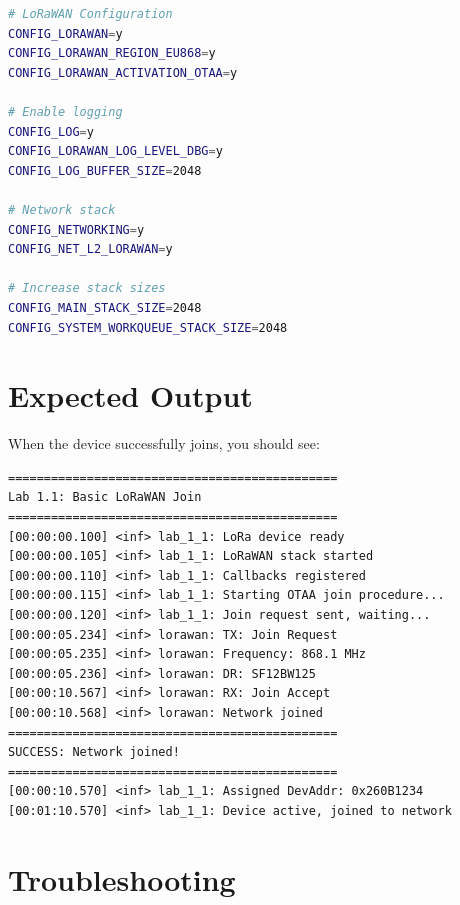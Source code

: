 \documentclass[11pt,a4paper]{article}
\begin{document}
\begin{solutionbox}
\begin{lstlisting}[language=bash]
# LoRaWAN Configuration
CONFIG_LORAWAN=y
CONFIG_LORAWAN_REGION_EU868=y
CONFIG_LORAWAN_ACTIVATION_OTAA=y

# Enable logging
CONFIG_LOG=y
CONFIG_LORAWAN_LOG_LEVEL_DBG=y
CONFIG_LOG_BUFFER_SIZE=2048

# Network stack
CONFIG_NETWORKING=y
CONFIG_NET_L2_LORAWAN=y

# Increase stack sizes
CONFIG_MAIN_STACK_SIZE=2048
CONFIG_SYSTEM_WORKQUEUE_STACK_SIZE=2048
\end{lstlisting}

\end{solutionbox}

\section{Expected Output}

When the device successfully joins, you should see:

\begin{lstlisting}
==============================================
Lab 1.1: Basic LoRaWAN Join
==============================================
[00:00:00.100] <inf> lab_1_1: LoRa device ready
[00:00:00.105] <inf> lab_1_1: LoRaWAN stack started
[00:00:00.110] <inf> lab_1_1: Callbacks registered
[00:00:00.115] <inf> lab_1_1: Starting OTAA join procedure...
[00:00:00.120] <inf> lab_1_1: Join request sent, waiting...
[00:00:05.234] <inf> lorawan: TX: Join Request
[00:00:05.235] <inf> lorawan: Frequency: 868.1 MHz
[00:00:05.236] <inf> lorawan: DR: SF12BW125
[00:00:10.567] <inf> lorawan: RX: Join Accept
[00:00:10.568] <inf> lorawan: Network joined
==============================================
SUCCESS: Network joined!
==============================================
[00:00:10.570] <inf> lab_1_1: Assigned DevAddr: 0x260B1234
[00:01:10.570] <inf> lab_1_1: Device active, joined to network
\end{lstlisting}

\section{Troubleshooting}
\end{document}

